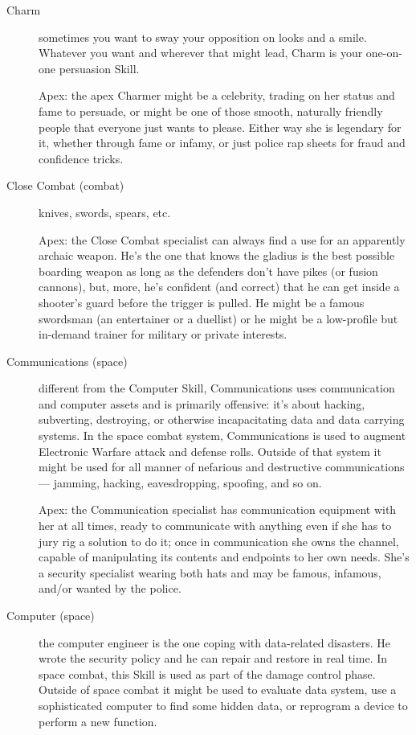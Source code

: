 \begin{description}
\item[Charm]
sometimes you want to sway your opposition on looks and a smile. Whatever you want and wherever that might lead, Charm is your one-on-one persuasion Skill.

Apex: the apex Charmer might be a celebrity, trading on her status and fame to persuade, or might be one of those smooth, naturally friendly people that everyone just wants to please. Either way she is legendary for it, whether through fame or infamy, or just police rap sheets for fraud and confidence tricks.

\item[Close Combat (combat)]
knives, swords, spears, etc.

Apex: the Close Combat specialist can always find a use for an apparently archaic weapon. He's the one that knows the gladius is the best possible boarding weapon as long as the defenders don't have pikes (or fusion cannons), but, more, he's confident (and correct) that he can get inside a shooter's guard before the trigger is pulled. He might be a famous swordsman (an entertainer or a duellist) or he might be a low-profile but in-demand trainer for military or private interests.

\item[Communications (space)]
different from the Computer Skill, Communications uses communication and computer assets and is primarily offensive: it's about hacking, subverting, destroying, or otherwise incapacitating data and data carrying systems. In the space combat system, Communications is used to augment Electronic Warfare attack and defense rolls. Outside of that system it might be used for all manner of nefarious and destructive communications --- jamming, hacking, eavesdropping, spoofing, and so on.

Apex: the Communication specialist has communication equipment with her at all times, ready to communicate with anything even if she has to jury rig a solution to do it; once in communication she owns the channel, capable of manipulating its contents and endpoints to her own needs. She's a security specialist wearing both hats and may be famous, infamous, and/or wanted by the police.

\item[Computer (space)]
the computer engineer is the one coping with da\-ta-re\-la\-ted disasters. He wrote the security policy and he can repair and restore in real time. In space combat, this Skill is used as part of the damage control phase.  Outside of space combat it might be used to evaluate data system, use a sophisticated computer to find some hidden data, or reprogram a device to perform a new function.


\end{description}
